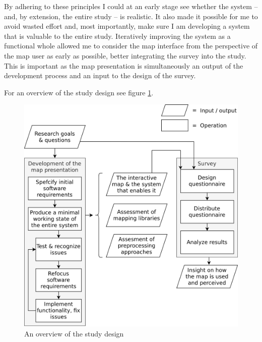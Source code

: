 By adhering to these principles I could at an early stage see whether the system --
and, by extension, the entire study -- is realistic.
It also made it possible for me to avoid wasted effort and, most importantly,
make sure I am developing a system that is valuable to the entire study.
Iteratively improving the system as a functional whole
allowed me to consider the map interface
from the perspective of the map user as early as possible,
better integrating the survey into the study.
This is important as the map presentation is simultaneously an output of the development process
and an input to the design of the survey.

For an overview of the study design see figure \ref{fig:study design}.


\begin{figure}[H]
	\centering
	\includegraphics[width=\diagramwidth]{visual/figures/diagrams/study_design.png}
	\caption{An overview of the study design}
	\label{fig:study design}
\end{figure}


